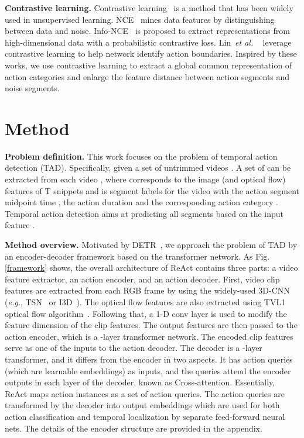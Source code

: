 \documentclass[runningheads]{llncs}
\def\eg{{\em e.g.}}
\def\etal{{\em et al. }}
\newcommand{\figref}[1]{Fig. \ref{#1}}
\newcommand{\myPara}[1]{\vspace{.05in}\noindent\textbf{#1}}
\def\name{ReAct }
\begin{document}
\myPara{Contrastive learning.}
Contrastive learning~\cite{chen2020simple} is a method that has been widely used in unsupervised learning. NCE~\cite{gutmann2010noise} mines data features by distinguishing between data and noise. Info-NCE~\cite{van2018representation} is proposed to extract representations from high-dimensional data with a probabilistic contrastive loss. Lin~\etal~\cite{lin2021learning} leverage contrastive learning to help network identify action boundaries. Inspired by these works, we use contrastive learning to extract a global common representation of action categories and enlarge the feature distance between action segments and noise segments. 









\section{Method}\label{sec:method}

\myPara{Problem definition.}
This work focuses on the problem of temporal action detection (TAD). Specifically, given a set of untrimmed videos . A set of  can be extracted from each video , where  corresponds to the image (and optical flow) features of T snippets and  is  segment labels for the video  with the action segment midpoint time , the action duration  and the corresponding action category . Temporal action detection aims at predicting all segments  based on the input feature . 

\myPara{Method overview.}
Motivated by DETR~\cite{carion2020end}, we approach the problem of TAD by an encoder-decoder framework based on the transformer network. 
As \figref{framework} shows, the overall architecture of \name contains three parts: a video feature extractor, an action encoder, and an action decoder.
First, video clip features are extracted from each RGB frame by using the widely-used 3D-CNN (\eg,  TSN~\cite{wang2018temporal} or I3D~\cite{carreira2017quo}). The optical flow features are also extracted using TVL1 optical flow algorithm~\cite{zach2007duality}.
Following that, a 1-D conv layer is used to modify the feature dimension of the clip features. The output features are then passed to the action encoder, which is a -layer transformer network. The encoded clip features serve as one of the inputs to the action decoder. 
The decoder is a -layer transformer, and it differs from the encoder in two aspects. It has action queries (which are learnable embeddings) as inputs, and the queries attend the encoder outputs in each layer of the decoder, known as Cross-attention.
Essentially, \name maps action instances as a set of action queries. The action queries are transformed by the decoder into output embeddings which are used for both action classification and temporal localization by separate feed-forward neural nets. 
The details of the encoder structure are provided in the appendix.
\end{document}
